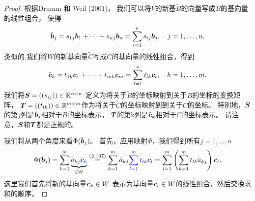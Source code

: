 \begin{proof}
    根据Drumm 和 Weil (2001)，
    我们可以将$V$的新基$\tilde{B}$的向量写成$B$的基向量的线性组合，
    使得
    \begin{equation}
        \tilde{\boldsymbol{b}}_j = s_{1j}\boldsymbol{b}_1 + \cdots + s_{nj}\boldsymbol{b}_n =
        \sum_{i=1}^{n} s_{ij}\boldsymbol{b}_{j},
        \quad j = 1,\dots, n.
    \end{equation}
    类似的,我们将$W$的新基向量$\tilde{C}$写成$C$的基向量的线性组合，得到
    \begin{equation}
        \tilde{\boldsymbol{c}}_k = t_{1k}\boldsymbol{c}_1 + \cdots + t_{mk}\boldsymbol{c}_m =
        \sum_{l=1}^{n} t_{lk}\boldsymbol{c}_{l},
        \quad k = 1,\dots, m.
    \end{equation}
    我们将$\boldsymbol{S}=((s_{ij})) \in \mathbb{R}^{n \times n}$
    定义为将关于$\tilde{B}$的坐标映射到关于$B$的坐标的变换矩阵，
    $\boldsymbol{T}= ((t_{lk})) \in \mathbb{R} ^ {m\times m}$作为将关于$\tilde{C}$的坐标映射到到关于$C$的坐标。
    特别地，$\boldsymbol{S}$的第$j$列是$\tilde{\boldsymbol{b}}_j$相对于$B$的坐标表示，
    $\boldsymbol{T}$的第k列是$\tilde{\boldsymbol{c}}_k$相对于$C$的坐标表示。
    请注意，$\boldsymbol{S}$和$\boldsymbol{T}$都是正规的。

    我们将从两个角度来看$\Phi(\tilde{\boldsymbol{b}}_j)$。
    首先，应用映射$\Phi$，我们得到所有$j = 1,\dots, n$
    \begin{equation}
        \Phi(\tilde{\boldsymbol{b}}_j) =
        \sum_{k=1}^{m}
        \underbrace{\tilde{a}_{kj} {\color{blue}\tilde{\boldsymbol{c}}_k}}_{\in W}
        \overset{(2.107)}{=}
        \sum_{k=1}^{m} \tilde{a}_{kj}
        {\color{blue} \sum_{l=1}^{m}t_{lk}\boldsymbol{c}_l}
        =
        \sum_{l=1}^{m}
        \left(
            \sum_{k=1}^{m} t_{lk} \tilde{a}_{kj}
        \right)
        \boldsymbol{c}_l,
    \end{equation}
    这里我们首先将新的基向量$\tilde{\boldsymbol{c}}_k \in W$
    表示为基向量$\boldsymbol{c}_l \in W$的线性组合，然后交换求和的顺序。


\end{proof}

